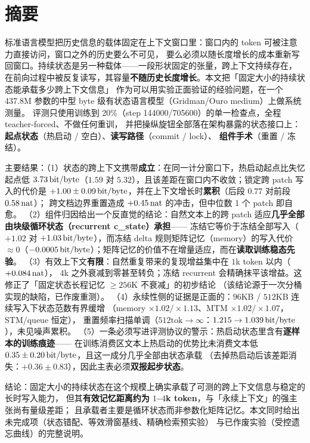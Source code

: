 \section*{摘要}

标准语言模型把历史信息的载体固定在上下文窗口里：窗口内的 token 可被注意力直接访问，窗口之外的历史要么不可见，
要么必须以随长度增长的成本重新写回窗口。持续状态是另一种载体——一段形状固定的张量，跨上下文持续存在，
在前向过程中被反复读写，其容量\textbf{不随历史长度增长}。本文把「固定大小的持续状态能承载多少跨上下文信息」
作为可以用实验正面验证的经验问题，在一个 437.8M 参数的中型 byte 级有状态语言模型（Gridman/Ouro medium）上做系统测量。
评测只使用训练到 20\%（step 144000/705600）的单一检查点，全程 teacher-forced、不做任何重训，
并把操纵旋钮全部落在架构暴露的状态接口上：\textbf{起点状态}（热启动 / 空白）、\textbf{读写路径}（commit / lock）、
\textbf{组件手术}（重置 / 冻结）。

主要结果：（1）状态的跨上下文携带\textbf{成立}：在同一计分窗口下，热启动起点比失忆起点低
$3.73\,\mathrm{bit/byte}$（$1.59$ 对 $5.32$），且该差距在窗口内不收敛；锁定跨 patch 写入的代价是
$+1.00\pm0.09\,\mathrm{bit/byte}$，并在上下文增长时\textbf{累积}（后段 $0.77$ 对前段 $0.58\,\mathrm{nat}$）；
跨文档边界重置造成 $+0.45\,\mathrm{nat}$ 的冲击，但中位数 1 个 patch 即自愈。
（2）组件归因给出一个反直觉的结论：自然文本上的跨 patch 适应\textbf{几乎全部由块级循环状态（recurrent c\_state）承担}——
冻结它等价于冻结全部写入（$+1.02$ 对 $+1.03\,\mathrm{bit/byte}$），而冻结 delta 规则矩阵记忆（memory）的写入代价
$\approx 0$（$-0.0005\,\mathrm{bit/byte}$）；矩阵记忆的价值不在增量适应，而在\textbf{读取训练稳态先验}。
（3）有效上下文\textbf{有限}：自然重复带来的复现增益集中在 $1$k token 以内（$+0.084\,\mathrm{nat}$），
$4$k 之外衰减到零甚至转负；冻结 recurrent 会精确抹平该增益。这修正了「固定状态长程记忆 $\ge 256$K 不衰减」的初步结论
（该结论源于一次分桶实现的缺陷，已作废重测）。
（4）永续性侧的证据是正面的：$96$KB / $512$KB 连续写入下状态范数有界缓增
（memory $\times1.02/\times1.13$、MTM $\times1.02/\times1.07$，STM/queue 恒定），
重置频率扫描单调（$512\text{tok}\to\infty$：$1.215\to1.039\,\mathrm{bit/byte}$），未见噪声累积。
（5）一条必须写进评测协议的警示：热启动状态里含有\textbf{逐样本的训练痕迹}——
在训练消费区文本上热启动的优势比未消费文本低 $0.35\pm0.20\,\mathrm{bit/byte}$，且这一成分几乎全部由状态承载
（去掉热启动后该差距消失：$+0.36\pm0.83$），因此主表必须\textbf{双报起步状态}。

结论：固定大小的持续状态在这个规模上确实承载了可测的跨上下文信息与稳定的长时写入能力，
但其\textbf{有效记忆距离约为 $1$–$4$k token}，与「永续上下文」的强主张尚有量级差距；
且承载者主要是循环状态而非参数化矩阵记忆。本文同时给出未完成项（状态错配、等效滑窗基线、精确检索预实验）
与已作废实验（受控遗忘曲线）的完整说明。

